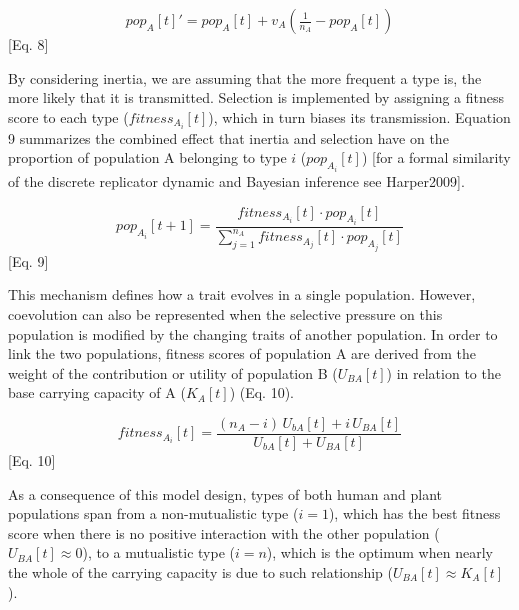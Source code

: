 \documentclass[
]{book}
\begin{document}
\[pop_{A}[t]'=pop_{A}[t]+v_{A}\left(\tfrac{1}{n_{A}}-pop_{A}[t]\right)\] {[}Eq. 8{]}

By considering inertia, we are assuming that the more frequent a type is, the more likely that it is transmitted. Selection is implemented by assigning a fitness score to each type (\(fitness_{A_{i}}[t]\)), which in turn biases its transmission. Equation 9 summarizes the combined effect that inertia and selection have on the proportion of population A belonging to type \(i\) (\(pop_{A_{i}}[t]\)) {[}for a formal similarity of the discrete replicator dynamic and Bayesian inference see Harper2009{]}.

\[pop_{A_{i}}[t+1]=\frac{fitness_{A_{i}}[t]\cdot pop_{A_{i}}[t]}{\sum_{j=1}^{n_{A}}fitness_{A_{j}}[t]\cdot pop_{A_{j}}[t]}\] {[}Eq. 9{]}

This mechanism defines how a trait evolves in a single population. However, coevolution can also be represented when the selective pressure on this population is modified by the changing traits of another population. In order to link the two populations, fitness scores of population A are derived from the weight of the contribution or utility of population B (\(U_{BA}[t]\)) in relation to the base carrying capacity of A (\(K_{A}[t]\)) (Eq. 10).

\[fitness_{A_{i}}[t]=\frac{(n_{A}-i)\,U_{bA}[t]+i\,U_{BA}[t]}{U_{bA}[t]+U_{BA}[t]}\] {[}Eq. 10{]}

As a consequence of this model design, types of both human and plant populations span from a non-mutualistic type (\(i=1\)), which has the best fitness score when there is no positive interaction with the other population (\(U_{BA}[t]\approx 0\)), to a mutualistic type (\(i=n\)), which is the optimum when nearly the whole of the carrying capacity is due to such relationship (\(U_{BA}[t]\approx K_{A}[t]\)).
\end{document}
